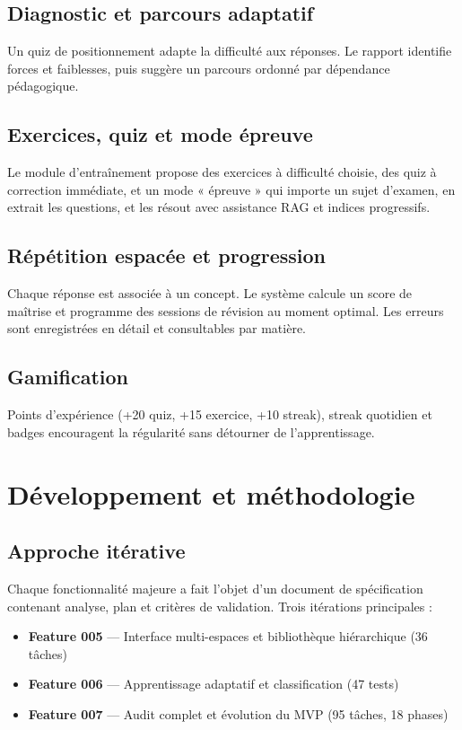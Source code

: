 \documentclass[11pt,a4paper]{article}
\begin{document}
\subsection{Diagnostic et parcours adaptatif}

Un quiz de positionnement adapte la difficulté aux réponses. Le rapport identifie forces et faiblesses, puis suggère un parcours ordonné par dépendance pédagogique.

\subsection{Exercices, quiz et mode épreuve}

Le module d'entraînement propose des exercices à difficulté choisie, des quiz à correction immédiate, et un mode « épreuve » qui importe un sujet d'examen, en extrait les questions, et les résout avec assistance RAG et indices progressifs.

\subsection{Répétition espacée et progression}

Chaque réponse est associée à un concept. Le système calcule un score de maîtrise et programme des sessions de révision au moment optimal. Les erreurs sont enregistrées en détail et consultables par matière.

\subsection{Gamification}

Points d'expérience (+20 quiz, +15 exercice, +10 streak), streak quotidien et badges encouragent la régularité sans détourner de l'apprentissage.

\section{Développement et méthodologie}

\subsection{Approche itérative}

Chaque fonctionnalité majeure a fait l'objet d'un document de spécification contenant analyse, plan et critères de validation. Trois itérations principales :

\begin{itemize}
    \item \textbf{Feature 005} --- Interface multi-espaces et bibliothèque hiérarchique (36 tâches)
    \item \textbf{Feature 006} --- Apprentissage adaptatif et classification (47 tests)
    \item \textbf{Feature 007} --- Audit complet et évolution du MVP (95 tâches, 18 phases)
\end{itemize}
\end{document}
